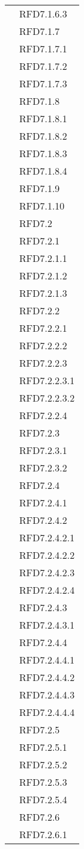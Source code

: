 \begin{longtable}{|>{\centering}m{10cm}|m{3cm}<{\centering}|}
& RFD7.1.6.3\\
& RFD7.1.7\\
& RFD7.1.7.1\\
& RFD7.1.7.2\\
& RFD7.1.7.3\\
& RFD7.1.8\\
& RFD7.1.8.1\\
& RFD7.1.8.2\\
& RFD7.1.8.3\\
& RFD7.1.8.4\\
& RFD7.1.9\\
& RFD7.1.10\\
& RFD7.2\\
& RFD7.2.1\\
& RFD7.2.1.1\\
& RFD7.2.1.2\\
& RFD7.2.1.3\\
& RFD7.2.2\\
& RFD7.2.2.1\\
& RFD7.2.2.2\\
& RFD7.2.2.3\\
& RFD7.2.2.3.1\\
& RFD7.2.2.3.2\\
& RFD7.2.2.4\\
& RFD7.2.3\\
& RFD7.2.3.1\\
& RFD7.2.3.2\\
& RFD7.2.4\\
& RFD7.2.4.1\\
& RFD7.2.4.2\\
& RFD7.2.4.2.1\\
& RFD7.2.4.2.2\\
& RFD7.2.4.2.3\\
& RFD7.2.4.2.4\\
& RFD7.2.4.3\\
& RFD7.2.4.3.1\\
& RFD7.2.4.4\\
& RFD7.2.4.4.1\\
& RFD7.2.4.4.2\\
& RFD7.2.4.4.3\\
& RFD7.2.4.4.4\\
& RFD7.2.5\\
& RFD7.2.5.1\\
& RFD7.2.5.2\\
& RFD7.2.5.3\\
& RFD7.2.5.4\\
& RFD7.2.6\\
& RFD7.2.6.1\\

\end{longtable}
